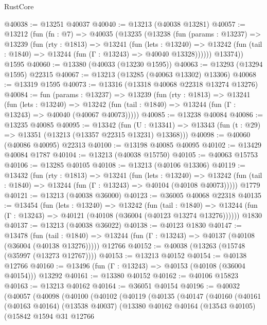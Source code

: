 \begin{lexlean}{RustCore}
\begin{coremodule}
@40038 := @13251 @40037
@40040 := @13213 (@40038 @13281)
@40057 := @13212
    (fun (fn : @7) =>
    @40035
      (@13235
        (@13238
          (fun (params : @13237) =>
          @13239
            (fun (rty : @1813) =>
            @13241
              (fun (lets : @13240) =>
              @13242 (fun (tail : @1840) => @13244 (fun (Γ : @13243) => @40040 @13328))))))
        @13374))
    @1595
@40060 := @13380 (@40033 (@13230 @1595))
@40063 := @13293 (@13294 @1595) @22315
@40067 := @13213 (@13285 (@40063 @13302) @13306)
@40068 := @13319 @1595
@40073 := @13316 (@13318 @40068 @22318 @13274 @13276)
@40084 := fun (params : @13237) =>
  @13239
    (fun (rty : @1813) =>
    @13241
      (fun (lets : @13240) =>
      @13242 (fun (tail : @1840) => @13244 (fun (Γ : @13243) => @40040 (@40067 @40073)))))
@40085 := @13238 @40084
@40086 := @13235 @40085
@40095 := @13342
    (fun (U : @13341) => @13343 (fun (t : @29) => @13351 (@13213 (@13357 @22315 @13231) @13368)))
@40098 := @40060 (@40086 @40095) @22313
@40100 := @13198 @40085 @40095
@40102 := @13429 @40084 @1787
@40104 := @13213 (@40038 @15750)
@40105 := @40063 @15753
@40106 := @13285 @40105
@40108 := @13213 (@40106 @13306)
@40119 := @13432
    (fun (rty : @1813) =>
    @13241
      (fun (lets : @13240) =>
      @13242 (fun (tail : @1840) => @13244 (fun (Γ : @13243) => @40104 (@40108 @40073)))))
    @1779
@40121 := @13213 (@40038 @36000)
@40123 := @36005 @40068 @22318
@40135 := @13454
    (fun (lets : @13240) =>
    @13242
      (fun (tail : @1840) =>
      @13244 (fun (Γ : @13243) => @40121 (@40108 (@36004 (@40123 @13274 @13276))))))
    @1830
@40137 := @13213 (@40038 @36022)
@40138 := @40123 @1830
@40147 := @13478
    (fun (tail : @1840) => @13244 (fun (Γ : @13243) => @40137 (@40108 (@36004 (@40138 @13276)))))
    @12766
@40152 := @40038 (@13263 (@15748 (@35997 (@13273 @12767))))
@40153 := @13213 @40152
@40154 := @40138 @12766
@40160 := @13496 (fun (Γ : @13243) => @40153 (@40108 (@36004 @40154))) @13292
@40161 := @13380 @40152
@40162 := @40106 @15823
@40163 := @13213 @40162
@40164 := @36051 @40154
@40196 := @40032
    (@40057
      (@40098
        (@40100
          (@40102
            (@40119
              (@40135
                (@40147
                  (@40160
                    (@40161
                      (@40163 @40164)
                      (@13538 @40037)
                      (@13380
                        @40162
                        @40164
                        (@13543 @40105)
                        (@15842
                          @1594
                          @31
                          @12766

\end{coremodule}
\end{lexlean}
